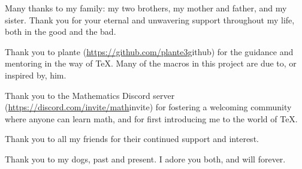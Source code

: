 Many thanks to my family: my two brothers, my mother and father, and my sister.
Thank you for your eternal and unwavering support throughout my life, both in the good and the bad.

Thank you to plante (\url{https://github.com/plante3}{github}) for the guidance and mentoring in the way of \TeX.
Many of the macros in this project are due to, or inspired by, him.

Thank you to the Mathematics Discord server (\url{https://discord.com/invite/math}{invite}) for fostering a welcoming community where anyone can learn math, and for first introducing me to the world of \TeX.

Thank you to all my friends for their continued support and interest.

Thank you to my dogs, past and present.
I adore you both, and will forever.

